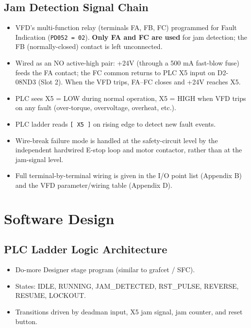 \documentclass[hidelinks,12pt]{article}
\begin{document}
\subsection{Jam Detection Signal Chain}
\begin{itemize}
    \item VFD's multi-function relay (terminals FA, FB, FC) programmed for Fault Indication (\texttt{PD052 = 02}). \textbf{Only FA and FC are used} for jam detection; the FB (normally-closed) contact is left unconnected.
    \item Wired as an NO active-high pair: +24V (through a 500 mA fast-blow fuse) feeds the FA contact; the FC common returns to PLC X5 input on D2-08ND3 (Slot 2). When the VFD trips, FA--FC closes and +24V reaches X5.
    \item PLC sees X5 = LOW during normal operation, X5 = HIGH when VFD trips on any fault (over-torque, overvoltage, overheat, etc.).
    \item PLC ladder reads \texttt{[ X5 ]} on rising edge to detect new fault events.
    \item Wire-break failure mode is handled at the safety-circuit level by the independent hardwired E-stop loop and motor contactor, rather than at the jam-signal level.
    \item Full terminal-by-terminal wiring is given in the I/O point list (Appendix B) and the VFD parameter/wiring table (Appendix D).
\end{itemize}

\section{Software Design}

\subsection{PLC Ladder Logic Architecture}
\begin{itemize}
    \item Do-more Designer stage program (similar to grafcet / SFC).
    \item States: IDLE, RUNNING, JAM\_DETECTED, RST\_PULSE, REVERSE, RESUME, LOCKOUT.
    \item Transitions driven by deadman input, X5 jam signal, jam counter, and reset button.
\end{itemize}
\end{document}
